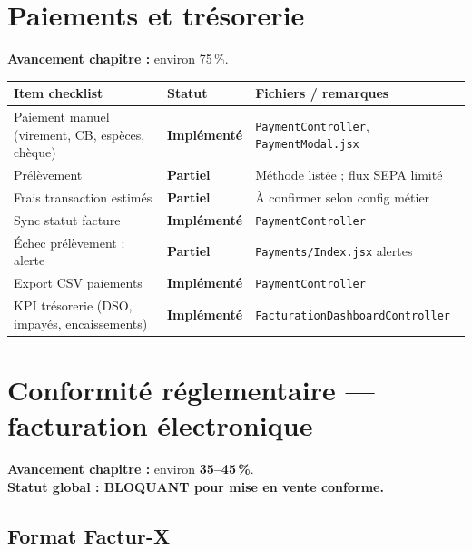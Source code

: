 \documentclass[11pt,a4paper]{report}
\newcommand{\route}[1]{\texttt{\small #1}}
\newcommand{\ctrl}[1]{\texttt{\small #1}}
\newcommand{\statimpl}{\textcolor{statok}{\textbf{Implémenté}}}
\newcommand{\statpart}{\textcolor{statpartial}{\textbf{Partiel}}}
\begin{document}
\chapter{Paiements et trésorerie}

\textbf{Avancement chapitre :} environ 75\,\%.

\begin{longtable}{@{}L{7.8cm}C{2.4cm}L{4.4cm}@{}}
    \toprule
    \textbf{Item checklist} & \textbf{Statut} & \textbf{Fichiers / remarques} \\
    \midrule
    \endhead
    Paiement manuel (virement, CB, espèces, chèque) & \statimpl & \ctrl{PaymentController}, \route{PaymentModal.jsx} \\
    Prélèvement & \statpart & Méthode listée ; flux SEPA limité \\
    Frais transaction estimés & \statpart & À confirmer selon config métier \\
    Sync statut facture & \statimpl & \ctrl{PaymentController} \\
    Échec prélèvement : alerte & \statpart & \route{Payments/Index.jsx} alertes \\
    Export CSV paiements & \statimpl & \ctrl{PaymentController} \\
    KPI trésorerie (DSO, impayés, encaissements) & \statimpl & \ctrl{FacturationDashboardController} \\
    \bottomrule
\end{longtable}

\chapter{Conformité réglementaire — facturation électronique}

\textbf{Avancement chapitre :} environ \textbf{35--45\,\%}.\\
\textbf{Statut global : \textcolor{statno}{BLOQUANT pour mise en vente conforme.}}

\section{Format Factur-X}
\end{document}
